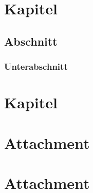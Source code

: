 

\frontmatter

\mainmatter

\chapter{Kapitel}

\section{Abschnitt}

\subsection{Unterabschnitt}

\chapter{Kapitel}


\appendix
\chapter{Attachment}

\chapter{Attachment}


\backmatter


